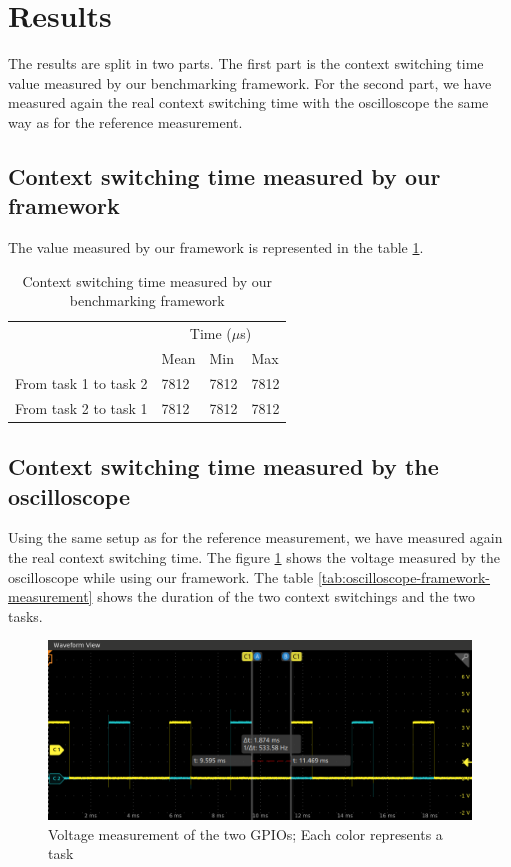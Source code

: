 \section{Results}

The results are split in two parts.
The first part is the context switching time value measured by our benchmarking framework.
For the second part, we have measured again the real context switching time with the oscilloscope the same way as for the reference measurement.

\subsection{Context switching time measured by our framework} 
The value measured by our framework is represented in the table \ref{tab:framework-measurement}.

\begin{table}[!ht]
  \centering
  \begin{tabular}{llll}
                        & \multicolumn{3}{c}{Time ($\mu$s)}          \\ \cline{2-4} 
                        & \multicolumn{1}{c}{Mean} & Min  & Max  \\ \cline{2-4} 
  From task 1 to task 2 & 7812                     & 7812 & 7812 \\
  From task 2 to task 1 & 7812                     & 7812 & 7812
  \end{tabular}
  \caption{Context switching time measured by our benchmarking framework}
  \label{tab:framework-measurement}
  \end{table}

\subsection{Context switching time measured by the oscilloscope}
Using the same setup as for the reference measurement, we have measured again the real context switching time.
The figure \ref{fig:framework-value-wave} shows the voltage measured by the oscilloscope while using our framework.
The table \ref{tab:oscilloscope-framework-measurement} shows the duration of the two context switchings and the two tasks.

\begin{figure}[!ht]
  \centering
  \includegraphics[scale=0.5]{assets/framework-value-wave.png}
  \caption{\label{fig:framework-value-wave}Voltage measurement of the two GPIOs; Each color represents a task}
\end{figure}

